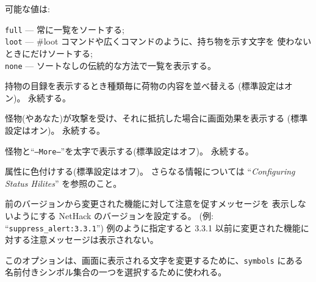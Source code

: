 可能な値は:

{\tt full} --- 常に一覧をソートする;\\
{\tt loot} --- \#loot コマンドや広くコマンドのように、持ち物を示す文字を
使わないときにだけソートする;\\
{\tt none} --- ソートなしの伝統的な方法で一覧を表示する。
\item[\ib{sortpack}]
持物の目録を表示するとき種類毎に荷物の内容を並べ替える
(標準設定はオン)。
永続する。
\item[\ib{sparkle}]
怪物(やあなた)が攻撃を受け、それに抵抗した場合に画面効果を表示する
(標準設定はオン)。
永続する。
\item[\ib{standout}]
怪物と``{\tt --More--}''を太字で表示する(標準設定はオフ)。
永続する。
\item[\ib{statushilites}]
属性に色付けする(標準設定はオフ)。
さらなる情報については ``{\it Configuring Status Hilites\/}'' を参照のこと。
\item[\ib{suppress\verb+_+alert}]
前のバージョンから変更された機能に対して注意を促すメッセージを
表示しないようにする NetHack のバージョンを設定する。
(例: ``{\tt suppress\verb+_+alert:3.3.1}'')
例のように指定すると 3.3.1 以前に変更された機能に対する注意メッセージは表示されない。
\item[\ib{symset}]
このオプションは、画面に表示される文字を変更するために、{\tt symbols} にある
名前付きシンボル集合の一つを選択するために使われる。
\item[\ib{time}]

